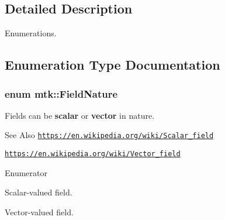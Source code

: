 \subsection{Detailed Description}
Enumerations. 

\subsection{Enumeration Type Documentation}
\hypertarget{group__c02-enums_ga4c54f2a329cfb4e56213b02a259d19e2}{
\subsubsection[{Field\-Nature}]{\setlength{\rightskip}{0pt plus 5cm}enum {\bf mtk\-::\-Field\-Nature}}}\label{group__c02-enums_ga4c54f2a329cfb4e56213b02a259d19e2}
Fields can be {\bfseries scalar} or {\bfseries vector} in nature.

\begin{DoxySeeAlso}{See Also}
\href{https://en.wikipedia.org/wiki/Scalar_field}{\tt https\-://en.\-wikipedia.\-org/wiki/\-Scalar\-\_\-field}

\href{https://en.wikipedia.org/wiki/Vector_field}{\tt https\-://en.\-wikipedia.\-org/wiki/\-Vector\-\_\-field} 
\end{DoxySeeAlso}
\begin{Desc}
\item[Enumerator]\par
\begin{description}
\item[{\em 
\hypertarget{group__c02-enums_ga4c54f2a329cfb4e56213b02a259d19e2af481d45bd70d41381c7d72e200889205}{S\-C\-A\-L\-A\-R}\label{group__c02-enums_ga4c54f2a329cfb4e56213b02a259d19e2af481d45bd70d41381c7d72e200889205}
}]Scalar-\/valued field. \item[{\em 
\hypertarget{group__c02-enums_ga4c54f2a329cfb4e56213b02a259d19e2a3d8cb27a993651a74d67fb8c98ae91b2}{V\-E\-C\-T\-O\-R}\label{group__c02-enums_ga4c54f2a329cfb4e56213b02a259d19e2a3d8cb27a993651a74d67fb8c98ae91b2}
}]Vector-\/valued field. \end{description}
\end{Desc}


